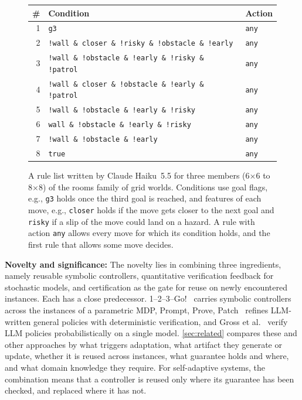 \begin{figure}[t]
\centering
\footnotesize
\setlength{\tabcolsep}{3pt}
\begin{tabularx}{\columnwidth}{@{}r>{\raggedright\arraybackslash}Xl@{}}
\toprule
\# & Condition & Action \\
\midrule
1 & \texttt{g3} & \texttt{any} \\
2 & \texttt{!wall \& closer \& !risky \& !obstacle \& !early} & \texttt{any} \\
3 & \texttt{!wall \& !obstacle \& !early \& !risky \& !patrol} & \texttt{any} \\
4 & \texttt{!wall \& closer \& !obstacle \& !early \& !patrol} & \texttt{any} \\
5 & \texttt{!wall \& !obstacle \& !early \& !risky} & \texttt{any} \\
6 & \texttt{wall \& !obstacle \& !early \& !risky} & \texttt{any} \\
7 & \texttt{!wall \& !obstacle \& !early} & \texttt{any} \\
8 & \texttt{true} & \texttt{any} \\
\bottomrule
\end{tabularx}
\caption{A rule list written by Claude Haiku~5.5 for three members (6$\times$6 to 8$\times$8) of the rooms family of grid worlds. Conditions use goal flags, e.g., \texttt{g3} holds once the third goal is reached, and features of each move, e.g., \texttt{closer} holds if the move gets closer to the next goal and \texttt{risky} if a slip of the move could land on a hazard. A rule with action \texttt{any} allows every move for which its condition holds, and the first rule that allows some move decides.}
\label{fig:intro-rules}
\end{figure}

\textbf{Novelty and significance:}
The novelty lies in combining three ingredients, namely reusable symbolic controllers, quantitative verification feedback for stochastic models, and certification as the gate for reuse on newly encountered instances.
Each has a close predecessor.
1--2--3--Go!~\cite{TODO-Azeem2025-123Go} carries symbolic controllers across the instances of a parametric MDP, Prompt, Prove, Patch~\cite{TODO-Drexler2026-PromptProvePatch} refines LLM-written general policies with deterministic verification, and Gross et al.~\cite{TODO-Gross2025-verifying-LLM-decisions} verify LLM policies probabilistically on a single model.
\autoref{sec:related} compares these and other approaches by what triggers adaptation, what artifact they generate or update, whether it is reused across instances, what guarantee holds and where, and what domain knowledge they require.
For self-adaptive systems, the combination means that a controller is reused only where its guarantee has been checked, and replaced where it has not.
